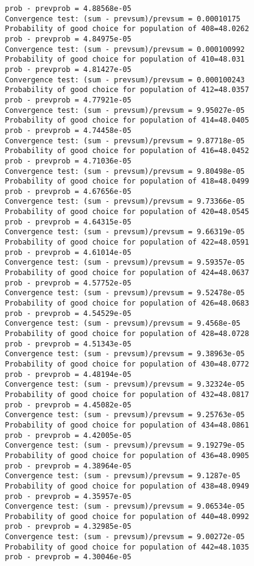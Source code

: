 \documentclass[11pt,onecolumn]{article}
\begin{document}
\begin{verbatim}
prob - prevprob = 4.88568e-05
Convergence test: (sum - prevsum)/prevsum = 0.00010175
Probability of good choice for population of 408=48.0262
prob - prevprob = 4.84975e-05
Convergence test: (sum - prevsum)/prevsum = 0.000100992
Probability of good choice for population of 410=48.031
prob - prevprob = 4.81427e-05
Convergence test: (sum - prevsum)/prevsum = 0.000100243
Probability of good choice for population of 412=48.0357
prob - prevprob = 4.77921e-05
Convergence test: (sum - prevsum)/prevsum = 9.95027e-05
Probability of good choice for population of 414=48.0405
prob - prevprob = 4.74458e-05
Convergence test: (sum - prevsum)/prevsum = 9.87718e-05
Probability of good choice for population of 416=48.0452
prob - prevprob = 4.71036e-05
Convergence test: (sum - prevsum)/prevsum = 9.80498e-05
Probability of good choice for population of 418=48.0499
prob - prevprob = 4.67656e-05
Convergence test: (sum - prevsum)/prevsum = 9.73366e-05
Probability of good choice for population of 420=48.0545
prob - prevprob = 4.64315e-05
Convergence test: (sum - prevsum)/prevsum = 9.66319e-05
Probability of good choice for population of 422=48.0591
prob - prevprob = 4.61014e-05
Convergence test: (sum - prevsum)/prevsum = 9.59357e-05
Probability of good choice for population of 424=48.0637
prob - prevprob = 4.57752e-05
Convergence test: (sum - prevsum)/prevsum = 9.52478e-05
Probability of good choice for population of 426=48.0683
prob - prevprob = 4.54529e-05
Convergence test: (sum - prevsum)/prevsum = 9.4568e-05
Probability of good choice for population of 428=48.0728
prob - prevprob = 4.51343e-05
Convergence test: (sum - prevsum)/prevsum = 9.38963e-05
Probability of good choice for population of 430=48.0772
prob - prevprob = 4.48194e-05
Convergence test: (sum - prevsum)/prevsum = 9.32324e-05
Probability of good choice for population of 432=48.0817
prob - prevprob = 4.45082e-05
Convergence test: (sum - prevsum)/prevsum = 9.25763e-05
Probability of good choice for population of 434=48.0861
prob - prevprob = 4.42005e-05
Convergence test: (sum - prevsum)/prevsum = 9.19279e-05
Probability of good choice for population of 436=48.0905
prob - prevprob = 4.38964e-05
Convergence test: (sum - prevsum)/prevsum = 9.1287e-05
Probability of good choice for population of 438=48.0949
prob - prevprob = 4.35957e-05
Convergence test: (sum - prevsum)/prevsum = 9.06534e-05
Probability of good choice for population of 440=48.0992
prob - prevprob = 4.32985e-05
Convergence test: (sum - prevsum)/prevsum = 9.00272e-05
Probability of good choice for population of 442=48.1035
prob - prevprob = 4.30046e-05

\end{verbatim}
\end{document}
